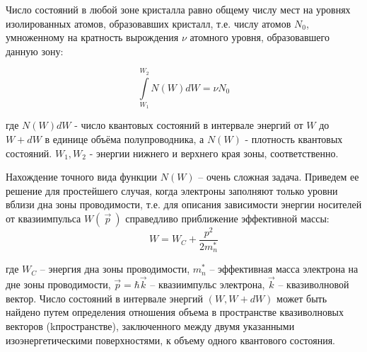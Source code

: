 Число состояний в любой зоне кристалла равно общему числу мест на уровнях изолированных атомов, образовавших кристалл,
т.е. числу атомов $N_0$, умноженному на кратность вырождения $\nu$ атомного уровня, образовавшего данную зону:

\begin{equation}
	\int \limits_{W_1}^{W_2} N(W) dW  =\nu N_0 
	\label{eq:2.1}
\end{equation} 

где $N(W)dW$ - число  квантовых состояний в интервале энергий от $W$ до $W+dW$ в единице объёма полупроводника, а $N(W)$
-  плотность квантовых состояний. $W_1,W_2$ - энергии нижнего и верхнего края зоны, соответственно. 

Нахождение точного вида функции $N(W)$ – очень сложная задача. Приведем ее решение для простейшего случая, когда электроны
заполняют только уровни вблизи дна зоны проводимости, т.е. для описания зависимости энергии носителей от квазиимпульса
$W(~\vec{p}~)$ справедливо приближение эффективной массы:   
\begin{equation}
	W = W_C + \frac{p^2}{2m_n^*}
	\label{eq:2.2}
\end{equation}

где $W_C$ – энергия дна зоны проводимости, $m_n^*$ –  эффективная масса электрона на дне зоны проводимости, $\vec{p} =
\hbar \vec{k}$ – квазиимпульс электрона, $\vec{k}$ – квазиволновой вектор. Число состояний в интервале энергий $(W, W+dW)$ может быть найдено
путем определения отношения объема в пространстве квазиволновых векторов (kпространстве), заключенного между двумя
указанными изоэнергетическими поверхностями, к объему одного квантового состояния. 

